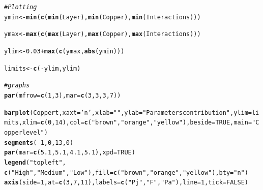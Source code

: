 \documentclass{article}\usepackage[]{graphicx}\usepackage[]{color}
\makeatletter
\newcommand{\hlnum}[1]{\textcolor[rgb]{0.686,0.059,0.569}{#1}}%
\newcommand{\hlstr}[1]{\textcolor[rgb]{0.192,0.494,0.8}{#1}}%
\newcommand{\hlcom}[1]{\textcolor[rgb]{0.678,0.584,0.686}{\textit{#1}}}%
\newcommand{\hlopt}[1]{\textcolor[rgb]{0,0,0}{#1}}%
\newcommand{\hlstd}[1]{\textcolor[rgb]{0.345,0.345,0.345}{#1}}%
\newcommand{\hlkwb}[1]{\textcolor[rgb]{0.69,0.353,0.396}{#1}}%
\newcommand{\hlkwc}[1]{\textcolor[rgb]{0.333,0.667,0.333}{#1}}%
\newcommand{\hlkwd}[1]{\textcolor[rgb]{0.737,0.353,0.396}{\textbf{#1}}}%
\newenvironment{kframe}{%
 \def\at@end@of@kframe{}%
 \ifinner\ifhmode%
  \def\at@end@of@kframe{\end{minipage}}%
  \begin{minipage}{\columnwidth}%
 \fi\fi%
 \def\FrameCommand##1{\hskip\@totalleftmargin \hskip-\fboxsep
 \colorbox{shadecolor}{##1}\hskip-\fboxsep
     \hskip-\linewidth \hskip-\@totalleftmargin \hskip\columnwidth}%
 \MakeFramed {\advance\hsize-\width
   \@totalleftmargin\z@ \linewidth\hsize
   \@setminipage}}%
 {\par\unskip\endMakeFramed%
 \at@end@of@kframe}
\newenvironment{knitrout}{}{} %
\makeatother
\begin{document}
\begin{knitrout}
\begin{kframe}
\begin{alltt}
\hlcom{# Plotting}
\hlstd{ymin}\hlkwb{<-}\hlkwd{min}\hlstd{(}\hlkwd{c}\hlstd{(}\hlkwd{min}\hlstd{(Layer),}\hlkwd{min}\hlstd{(Copper),}\hlkwd{min}\hlstd{(Interactions)))}

\hlstd{ymax}\hlkwb{<-}\hlkwd{max}\hlstd{(}\hlkwd{c}\hlstd{(}\hlkwd{max}\hlstd{(Layer),}\hlkwd{max}\hlstd{(Copper),}\hlkwd{max}\hlstd{(Interactions)))}

\hlstd{ylim}\hlkwb{<-}\hlnum{0.03}\hlopt{+}\hlkwd{max}\hlstd{(}\hlkwd{c}\hlstd{(ymax,}\hlkwd{abs}\hlstd{(ymin)))}

\hlstd{limits}\hlkwb{<-}\hlkwd{c}\hlstd{(}\hlopt{-}\hlstd{ylim,ylim)}

\hlcom{#graphs}
\hlkwd{par}\hlstd{(}\hlkwc{mfrow}\hlstd{=}\hlkwd{c}\hlstd{(}\hlnum{1}\hlstd{,}\hlnum{3}\hlstd{),}\hlkwc{mar}\hlstd{=}\hlkwd{c}\hlstd{(}\hlnum{3}\hlstd{,}\hlnum{3}\hlstd{,}\hlnum{3}\hlstd{,}\hlnum{7}\hlstd{))}

\hlkwd{barplot}\hlstd{(Coppert,}\hlkwc{xaxt}\hlstd{=}\hlstr{'n'}\hlstd{,} \hlkwc{xlab}\hlstd{=}\hlstr{""}\hlstd{,} \hlkwc{ylab}\hlstd{=}\hlstr{"Parameters contribution"}\hlstd{,} \hlkwc{ylim}\hlstd{=limits,} \hlkwc{xlim}\hlstd{=}\hlkwd{c}\hlstd{(}\hlnum{0}\hlstd{,}\hlnum{14}\hlstd{),} \hlkwc{col}\hlstd{=}\hlkwd{c}\hlstd{(}\hlstr{"brown"}\hlstd{,}\hlstr{"orange"}\hlstd{,} \hlstr{"yellow"}\hlstd{),} \hlkwc{beside}\hlstd{=}\hlnum{TRUE}\hlstd{,} \hlkwc{main}\hlstd{=}\hlstr{"Copper level"}\hlstd{)}
\hlkwd{segments}\hlstd{(}\hlopt{-}\hlnum{1}\hlstd{,}\hlnum{0}\hlstd{,} \hlnum{13}\hlstd{,}\hlnum{0}\hlstd{)}
\hlkwd{par}\hlstd{(}\hlkwc{mar}\hlstd{=}\hlkwd{c}\hlstd{(}\hlnum{5.1}\hlstd{,} \hlnum{5.1}\hlstd{,} \hlnum{4.1}\hlstd{,} \hlnum{5.1}\hlstd{),} \hlkwc{xpd}\hlstd{=}\hlnum{TRUE}\hlstd{)}
\hlkwd{legend}\hlstd{(}\hlstr{"topleft"}\hlstd{,}
     \hlkwd{c}\hlstd{(}\hlstr{"High"}\hlstd{,} \hlstr{"Medium"}\hlstd{,} \hlstr{"Low"}\hlstd{),} \hlkwc{fill}\hlstd{=}\hlkwd{c}\hlstd{(}\hlstr{"brown"}\hlstd{,}\hlstr{"orange"}\hlstd{,} \hlstr{"yellow"}\hlstd{),}  \hlkwc{bty}\hlstd{=}\hlstr{"n"}\hlstd{)}
\hlkwd{axis}\hlstd{(}\hlkwc{side}\hlstd{=}\hlnum{1}\hlstd{,} \hlkwc{at}\hlstd{=}\hlkwd{c}\hlstd{(}\hlnum{3}\hlstd{,}\hlnum{7}\hlstd{,}\hlnum{11}\hlstd{),} \hlkwc{labels}\hlstd{=}\hlkwd{c}\hlstd{(} \hlstr{"Pj"}\hlstd{,} \hlstr{"F"}\hlstd{,} \hlstr{"Pa"}\hlstd{),} \hlkwc{line}\hlstd{=}\hlnum{1}\hlstd{,} \hlkwc{tick}\hlstd{=}\hlnum{FALSE}\hlstd{)}


\end{alltt}
\end{kframe}
\end{knitrout}
\end{document}
